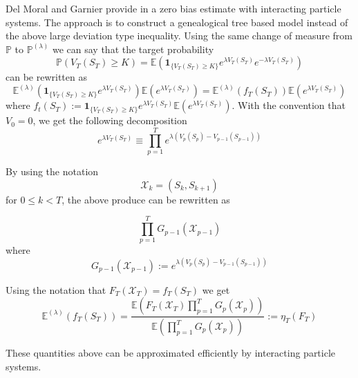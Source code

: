 Del Moral and Garnier provide in \cite{delmoral2005} a zero bias estimate with interacting particle systems. The approach is to construct a genealogical tree based model instead of the above large deviation type inequality.
Using the same change of measure from $\mathbb{P}$ to $\mathbb{P}^{(\lambda)}$ we can say that the target probability
$$\mathbb{P}(V_T(S_T) \geq K) = \mathbb{E}\left( \mathbf{1}_{\{V_T(S_T) \geq K\}}e^{\lambda V_T(S_T)}e^{-\lambda V_T(S_T)} \right)$$
can be rewritten as
$$\mathbb{E}^{(\lambda)} \left(  \mathbf{1}_{\{V_T(S_T) \geq K\}} e^{\lambda V_T(S_T)} \right) \mathbb{E} \left(e^{\lambda V_T(S_T)}\right) = 
\mathbb{E}^{(\lambda)}(f_T(S_T)) \mathbb{E}(e^{\lambda V_T(S_T)})  $$
where $f_t(S_T) := \mathbf{1}_{\{V_T(S_T) \geq K\}}e^{\lambda V_T(S_T)} \mathbb{E}\left(e^{\lambda V_T(S_T)}\right) $. With the convention that $V_0 = 0$, we get the following decomposition
$$e^{\lambda V_T(S_T)} \equiv \prod_{p=1}^{T} e^{\lambda (V_p(S_p) - V_{p-1}(S_{p-1}))}$$

By using the notation $$\mathcal{X}_k = (S_k, S_{k+1})$$ for $0 \leq k < T$, the above produce can be rewritten as

$$\prod_{p=1}^{T} G_{p-1}(\mathcal{X}_{p-1})$$ where
$$G_{p-1}(\mathcal{X}_{p-1}) := e^{\lambda (V_p(S_p) - V_{p-1}(S_{p-1}))}$$

Using the notation that $F_T(\mathcal{X}_T) = f_T(S_T)$ we get
\begin{equation}
	\mathbb{E}^{(\lambda)}(f_T(S_T)) = \frac{\mathbb{E}(F_T(\mathcal{X}_T)\prod_{p=1}^{T}G_p(\mathcal{X}_p))}{\mathbb{E}(\prod_{p=1}^{T}G_p(\mathcal{X}_p))} := \eta_T(F_T)
\end{equation}

These quantities above can be approximated efficiently by interacting particle systems.

